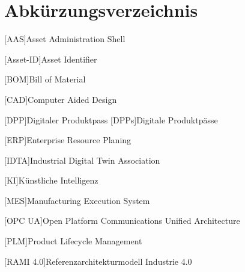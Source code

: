 \section*{Abkürzungsverzeichnis}
\begin{singlespacing}
\end{singlespacing}
\begin{acronym}

[AAS]{Asset Administration Shell}

[Asset-ID]{Asset Identifier}

[BOM]{Bill of Material}

[CAD]{Computer Aided Design}

[DPP]{Digitaler Produktpass}
[DPPs]{Digitale Produktpässe}

[ERP]{Enterprise Resource Planing}

[IDTA]{Industrial Digital Twin Association}

[KI]{Künstliche Intelligenz}

[MES]{Manufacturing Execution System}

[OPC UA]{Open Platform Communications Unified Architecture}

[PLM]{Product Lifecycle Management}

[RAMI 4.0]{Referenzarchitekturmodell Industrie 4.0}

\end{acronym}



\newpage